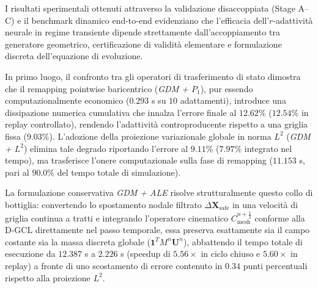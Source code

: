 
I risultati sperimentali ottenuti attraverso la validazione disaccoppiata (Stage A--C) e il benchmark dinamico end-to-end evidenziano che l'efficacia dell'$r$-adattività neurale in regime transiente dipende strettamente dall'accoppiamento tra generatore geometrico, certificazione di validità elementare e formulazione discreta dell'equazione di evoluzione.

In primo luogo, il confronto tra gli operatori di trasferimento di stato dimostra che il remapping pointwise baricentrico (\textit{GDM + $P_1$}), pur essendo computazionalmente economico ($0.293$ s su $10$ adattamenti), introduce una dissipazione numerica cumulativa che innalza l'errore finale al $12.62\%$ ($12.54\%$ in replay controllato), rendendo l'adattività controproducente rispetto a una griglia fissa ($9.03\%$). L'adozione della proiezione variazionale globale in norma $L^2$ (\textit{GDM + $L^2$}) elimina tale degrado riportando l'errore al $9.11\%$ ($7.97\%$ integrato nel tempo), ma trasferisce l'onere computazionale sulla fase di remapping ($11.153$ s, pari al $90.0\%$ del tempo totale di simulazione).

La formulazione conservativa \textit{GDM + ALE} risolve strutturalmente questo collo di bottiglia: convertendo lo spostamento nodale filtrato $\Delta\mathbf{X}_{\mathrm{safe}}$ in una velocità di griglia continua a tratti e integrando l'operatore cinematico $C_{\mathrm{mesh}}^{n+\frac12}$ conforme alla D-GCL direttamente nel passo temporale, essa preserva esattamente sia il campo costante sia la massa discreta globale ($\mathbf{1}^T M^n\mathbf{U}^n$), abbattendo il tempo totale di esecuzione da $12.387$ s a $2.226$ s (speedup di $5.56\times$ in ciclo chiuso e $5.60\times$ in replay) a fronte di uno scostamento di errore contenuto in $0.34$ punti percentuali rispetto alla proiezione $L^2$.

